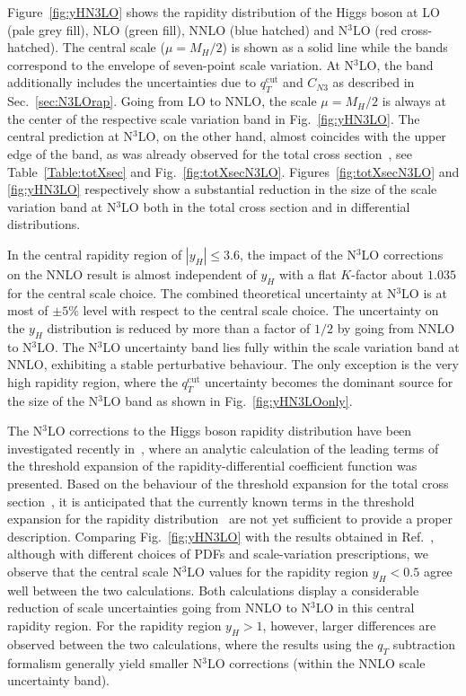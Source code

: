\documentclass[12pt]{article}
\DeclareRobustCommand{\qt}{q_T}
\DeclareRobustCommand{\qtcut}{\ensuremath{q_T^\mathrm{cut}}}
\begin{document}
Figure~\ref{fig:yHN3LO} shows the rapidity distribution of the Higgs boson at LO (pale grey fill), NLO (green fill), NNLO (blue hatched) and N$^{3}$LO (red cross-hatched). 
The central scale ($\mu=M_{H}/2$) is shown as a solid line while the bands correspond to the envelope of seven-point scale variation. 
At N$^{3}$LO, the band additionally includes the uncertainties due to $\qtcut$ and $C_{N3}$ as described in Sec.~\ref{sec:N3LOrap}.
Going from LO to NNLO, the scale $\mu=M_{H}/2$ is always at the center of the respective scale variation band in Fig.~\ref{fig:yHN3LO}.  The central prediction at N$^{3}$LO, on the other hand, almost coincides with the upper edge of the band, as was already observed for the total cross section~\cite{Anastasiou:2015ema,Mistlberger:2018etf}, see Table~\ref{Table:totXsec} and Fig.~\ref{fig:totXsecN3LO}.
Figures~\ref{fig:totXsecN3LO} and \ref{fig:yHN3LO} respectively show a substantial reduction in the size of the scale variation band at N$^{3}$LO both in the total cross section and in differential distributions.

In the central rapidity region of $|y_{H}| \leq 3.6$, the impact of the N$^{3}$LO corrections on the NNLO result is almost independent of $y_{H}$ with a flat $K$-factor about $1.035$ for the central scale choice. The combined theoretical uncertainty at N$^3$LO is at most of $\pm 5 \%$ level with respect to the central scale choice. The uncertainty on the $y_H$ distribution is reduced by more than a factor of $1/2$ by going from NNLO to N$^3$LO. The N$^3$LO uncertainty band lies fully within the scale variation band at NNLO, exhibiting a stable perturbative behaviour. 
The only exception is the very high rapidity region, where the $\qtcut$ uncertainty becomes the dominant source for the size of the N$^{3}$LO band as shown in Fig.~\ref{fig:yHN3LOonly}.

The N$^3$LO corrections to the Higgs boson rapidity distribution have been investigated recently in~\cite{Dulat:2017prg},
where an analytic calculation of the leading terms of the threshold expansion of the  rapidity-differential coefficient function 
was presented. Based on the behaviour of the threshold expansion for the total cross section~\cite{Anastasiou:2015ema}, 
it is anticipated that the currently known terms in the threshold expansion for the rapidity distribution~\cite{Dulat:2017prg} are not yet sufficient to provide a proper description.  
Comparing Fig.~\ref{fig:yHN3LO} with the results obtained in Ref.~\cite{Dulat:2017prg}, although with different choices of PDFs and scale-variation prescriptions, we observe that the central scale N$^3$LO values for the rapidity region $y_H < 0.5$ agree well between the two calculations. Both calculations display a considerable reduction of scale uncertainties going from NNLO to N$^3$LO in this central rapidity region. 
For the rapidity region $y_H > 1$, however, larger differences are observed between the two calculations, where the results using the $\qt$ subtraction formalism generally yield smaller N$^3$LO corrections 
(within the NNLO scale uncertainty band).
\end{document}
